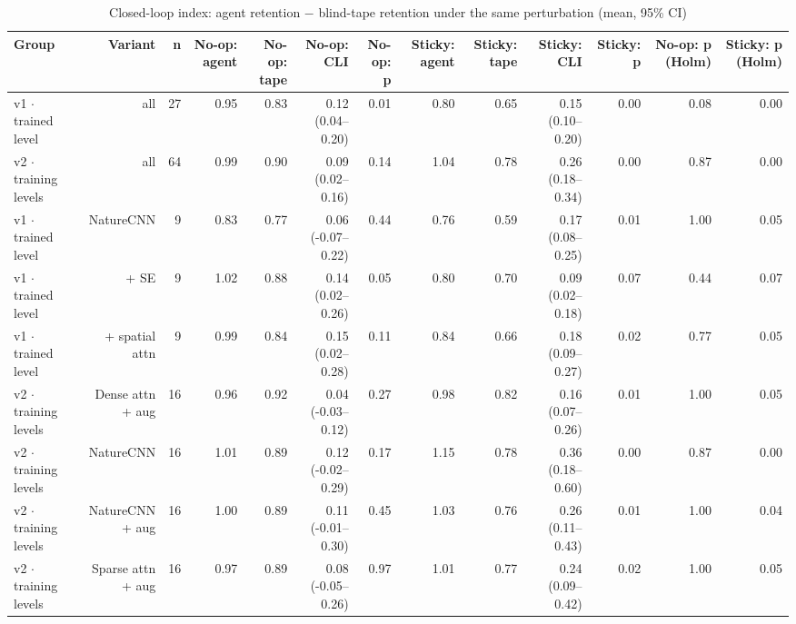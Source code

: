 \begin{table}[t]
\centering
\caption{Closed-loop index: agent retention $-$ blind-tape retention under the same perturbation (mean, 95\% CI)}
\label{tab:closed_loop_index}
\begin{tabular}{lrrrrrrrrrrrr}
\toprule
Group & Variant & n & No-op: agent & No-op: tape & No-op: CLI & No-op: p & Sticky: agent & Sticky: tape & Sticky: CLI & Sticky: p & No-op: p (Holm) & Sticky: p (Holm) \\
\midrule
v1 $\cdot$ trained level & all & 27 & 0.95 & 0.83 & 0.12 (0.04--0.20) & 0.01 & 0.80 & 0.65 & 0.15 (0.10--0.20) & 0.00 & 0.08 & 0.00 \\
v2 $\cdot$ training levels & all & 64 & 0.99 & 0.90 & 0.09 (0.02--0.16) & 0.14 & 1.04 & 0.78 & 0.26 (0.18--0.34) & 0.00 & 0.87 & 0.00 \\
v1 $\cdot$ trained level & NatureCNN & 9 & 0.83 & 0.77 & 0.06 (-0.07--0.22) & 0.44 & 0.76 & 0.59 & 0.17 (0.08--0.25) & 0.01 & 1.00 & 0.05 \\
v1 $\cdot$ trained level & + SE & 9 & 1.02 & 0.88 & 0.14 (0.02--0.26) & 0.05 & 0.80 & 0.70 & 0.09 (0.02--0.18) & 0.07 & 0.44 & 0.07 \\
v1 $\cdot$ trained level & + spatial attn & 9 & 0.99 & 0.84 & 0.15 (0.02--0.28) & 0.11 & 0.84 & 0.66 & 0.18 (0.09--0.27) & 0.02 & 0.77 & 0.05 \\
v2 $\cdot$ training levels & Dense attn + aug & 16 & 0.96 & 0.92 & 0.04 (-0.03--0.12) & 0.27 & 0.98 & 0.82 & 0.16 (0.07--0.26) & 0.01 & 1.00 & 0.05 \\
v2 $\cdot$ training levels & NatureCNN & 16 & 1.01 & 0.89 & 0.12 (-0.02--0.29) & 0.17 & 1.15 & 0.78 & 0.36 (0.18--0.60) & 0.00 & 0.87 & 0.00 \\
v2 $\cdot$ training levels & NatureCNN + aug & 16 & 1.00 & 0.89 & 0.11 (-0.01--0.30) & 0.45 & 1.03 & 0.76 & 0.26 (0.11--0.43) & 0.01 & 1.00 & 0.04 \\
v2 $\cdot$ training levels & Sparse attn + aug & 16 & 0.97 & 0.89 & 0.08 (-0.05--0.26) & 0.97 & 1.01 & 0.77 & 0.24 (0.09--0.42) & 0.02 & 1.00 & 0.05 \\
\bottomrule
\end{tabular}
\end{table}
